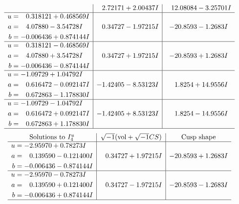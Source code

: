 \documentclass[1p]{elsarticle_modified}
\theoremstyle{definition}
\newcommand{\I}{\sqrt{-1}}
\begin{document}
$$\begin{array}{c|c|c}
 & \phantom{-}2.72171 + 2.00437 I & \phantom{-}12.08084 - 3.25701 I \\ \hline\begin{aligned}
u &= \phantom{-}0.318121 + 0.468569 I \\
a &= \phantom{-}4.07880 - 3.54728 I \\
b &= -0.006436 + 0.874144 I\end{aligned}
 & \phantom{-}0.34727 - 1.97215 I & -20.8593 - 1.2683 I \\ \hline\begin{aligned}
u &= \phantom{-}0.318121 - 0.468569 I \\
a &= \phantom{-}4.07880 + 3.54728 I \\
b &= -0.006436 - 0.874144 I\end{aligned}
 & \phantom{-}0.34727 + 1.97215 I & -20.8593 + 1.2683 I \\ \hline\begin{aligned}
u &= -1.09729 + 1.04792 I \\
a &= \phantom{-}0.616472 - 0.092147 I \\
b &= \phantom{-}0.672863 - 1.178830 I\end{aligned}
 & -1.42405 - 8.53123 I & \phantom{-}1.8254 + 14.9556 I \\ \hline\begin{aligned}
u &= -1.09729 - 1.04792 I \\
a &= \phantom{-}0.616472 + 0.092147 I \\
b &= \phantom{-}0.672863 + 1.178830 I\end{aligned}
 & -1.42405 + 8.53123 I & \phantom{-}1.8254 - 14.9556 I\\
 \hline 
 \end{array}$$\newpage$$\begin{array}{c|c|c}  
\text{Solutions to }I^u_{4}& \I (\text{vol} + \sqrt{-1}CS) & \text{Cusp shape}\\
 \hline 
\begin{aligned}
u &= -2.95970 + 0.78273 I \\
a &= \phantom{-}0.139590 - 0.121400 I \\
b &= -0.006436 - 0.874144 I\end{aligned}
 & \phantom{-}0.34727 + 1.97215 I & -20.8593 + 1.2683 I \\ \hline\begin{aligned}
u &= -2.95970 - 0.78273 I \\
a &= \phantom{-}0.139590 + 0.121400 I \\
b &= -0.006436 + 0.874144 I\end{aligned}
 & \phantom{-}0.34727 - 1.97215 I & -20.8593 - 1.2683 I\\
 \hline 
 \end{array}$$\newpage
\end{document}
